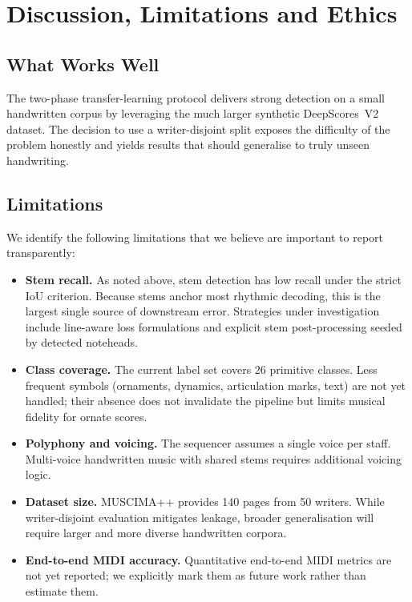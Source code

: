 \documentclass[conference]{IEEEtran}
\begin{document}
\section{Discussion, Limitations and Ethics}\label{sec:discussion}
\subsection{What Works Well}
The two-phase transfer-learning protocol delivers strong detection on a
small handwritten corpus by leveraging the much larger synthetic
DeepScores~V2 dataset. The decision to use a writer-disjoint split
exposes the difficulty of the problem honestly and yields results that
should generalise to truly unseen handwriting.

\subsection{Limitations}
We identify the following limitations that we believe are important to
report transparently:
\begin{itemize}
    \item \textbf{Stem recall.} As noted above, stem detection has low recall
    under the strict IoU criterion. Because stems anchor most rhythmic
    decoding, this is the largest single source of downstream error.
    Strategies under investigation include line-aware loss formulations and
    explicit stem post-processing seeded by detected noteheads.
    \item \textbf{Class coverage.} The current label set covers 26 primitive
    classes. Less frequent symbols (ornaments, dynamics, articulation marks,
    text) are not yet handled; their absence does not invalidate the
    pipeline but limits musical fidelity for ornate scores.
    \item \textbf{Polyphony and voicing.} The sequencer assumes a single
    voice per staff. Multi-voice handwritten music with shared stems
    requires additional voicing logic.
    \item \textbf{Dataset size.} MUSCIMA++ provides 140 pages from 50
    writers. While writer-disjoint evaluation mitigates leakage, broader
    generalisation will require larger and more diverse handwritten corpora.
    \item \textbf{End-to-end MIDI accuracy.} Quantitative end-to-end MIDI
    metrics are not yet reported; we explicitly mark them as future work
    rather than estimate them.
\end{itemize}
\end{document}
